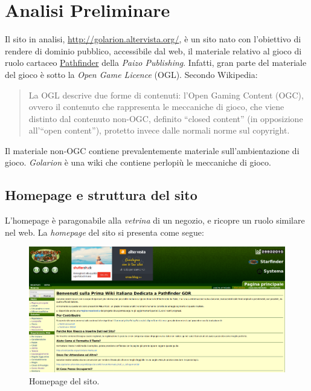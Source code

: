\section{Analisi Preliminare}\label{analisipre}

Il sito in analisi, \url{http://golarion.altervista.org/}, è un sito nato con l'obiettivo di
rendere di dominio pubblico, accessibile dal web, il materiale relativo al gioco di ruolo
cartaceo \href{https://it.wikipedia.org/wiki/Pathfinder_gioco_di_ruolo}{Pathfinder} della \emph{Paizo Publishing}. 
Infatti, gran parte del materiale del gioco è sotto la \emph{Open Game Licence} (OGL). Secondo Wikipedia:
\begin{quote}
    La OGL descrive due forme di contenuti: l'Open Gaming Content (OGC), ovvero il contenuto che 
    rappresenta le meccaniche di gioco, che viene distinto dal contenuto non-OGC, definito ``closed content'' 
    (in opposizione all'``open content''), protetto invece dalle normali norme sul copyright.    
\end{quote}

Il materiale non-OGC contiene prevalentemente materiale sull'ambientazione di gioco. \emph{Golarion} è una 
wiki che contiene perlopiù le meccaniche di gioco.

\subsection{Homepage e struttura del sito}
L'homepage è paragonabile alla \emph{vetrina} di un negozio, e ricopre un ruolo similare nel web.
La \emph{homepage} del sito si presenta come segue:

\begin{figure}[hbt]
    \centering
    \includegraphics[width=\textwidth]{img/home.png}
    \caption{Homepage del sito.}
    \label{homepage}
\end{figure}

